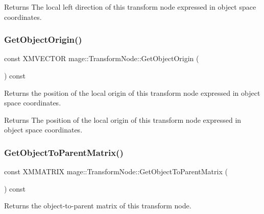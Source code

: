 \begin{DoxyReturn}{Returns}
The local left direction of this transform node expressed in object space coordinates. 
\end{DoxyReturn}
\hypertarget{structmage_1_1_transform_node_a5f97b639779c4b9d24e144f1d8c9da12}{}\label{structmage_1_1_transform_node_a5f97b639779c4b9d24e144f1d8c9da12} 
\subsubsection{\texorpdfstring{Get\+Object\+Origin()}{GetObjectOrigin()}}
{\footnotesize\ttfamily const X\+M\+V\+E\+C\+T\+OR mage\+::\+Transform\+Node\+::\+Get\+Object\+Origin (\begin{DoxyParamCaption}{ }\end{DoxyParamCaption}) const\hspace{0.3cm}{\ttfamily [noexcept]}}

Returns the position of the local origin of this transform node expressed in object space coordinates.

\begin{DoxyReturn}{Returns}
The position of the local origin of this transform node expressed in object space coordinates. 
\end{DoxyReturn}
\hypertarget{structmage_1_1_transform_node_a0056c77406b7c6fc29f50b1b0de69026}{}\label{structmage_1_1_transform_node_a0056c77406b7c6fc29f50b1b0de69026} 
\subsubsection{\texorpdfstring{Get\+Object\+To\+Parent\+Matrix()}{GetObjectToParentMatrix()}}
{\footnotesize\ttfamily const X\+M\+M\+A\+T\+R\+IX mage\+::\+Transform\+Node\+::\+Get\+Object\+To\+Parent\+Matrix (\begin{DoxyParamCaption}{ }\end{DoxyParamCaption}) const\hspace{0.3cm}{\ttfamily [noexcept]}}

Returns the object-\/to-\/parent matrix of this transform node.

